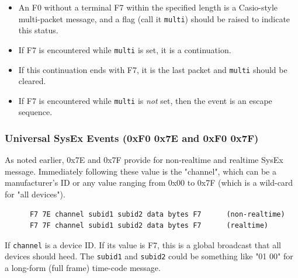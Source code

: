    \begin{itemize}
      \item An F0 without a terminal F7 within the specified length
         is a Casio-style multi-packet message,
         and a flag (call it \texttt{multi})
         should be raised to indicate this status.
      \item If F7 is encountered while \texttt{multi} is set,
         it is a continuation.
      \item If this continuation ends with F7, it is the last packet and
         \texttt{multi} should be cleared.
      \item If F7 is encountered while \texttt{multi} is \textsl{not} set,
         then the event is an escape sequence.
   \end{itemize}

\subsubsection{Universal SysEx Events (0xF0 0x7E and 0xF0 0x7F)}
\label{subsubsec:midi_format_meta_universalsysex_event}

   As noted earlier, 0x7E and 0x7F provide for non-realtime and realtime SysEx
   message.
   Immediately following these value is the "channel", which can be a
   manufacturer's ID or any value ranging from 0x00 to 0x7F (which is a
   wild-card for "all devices").

   \begin{verbatim}
      F7 7E channel subid1 subid2 data bytes F7      (non-realtime)
      F7 7F channel subid1 subid2 data bytes F7      (realtime)
   \end{verbatim}

   If \texttt{channel} is a device ID.
   If its value is F7, this is a global broadcast that all devices
   should heed.
   The \texttt{subid1} and \texttt{subid2}
   could be something like "01 00" for a long-form
   (full frame) time-code message.


